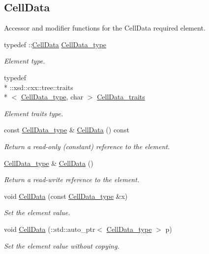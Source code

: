 \subsection*{Cell\-Data}
\label{_amgrp007b3d9997e1a909fe32a9f90c4a9977}%
Accessor and modifier functions for the Cell\-Data required element. \begin{DoxyCompactItemize}
\item 
typedef \-::\hyperlink{classCellData}{Cell\-Data} \hyperlink{classPieceUnstructuredGrid__t_a4232a7b88477ee6f692a4e5fab6a65d1}{Cell\-Data\-\_\-type}
\begin{DoxyCompactList}\small\item\em Element type. \end{DoxyCompactList}\item 
typedef \\*
\-::xsd\-::cxx\-::tree\-::traits\\*
$<$ \hyperlink{classPieceUnstructuredGrid__t_a4232a7b88477ee6f692a4e5fab6a65d1}{Cell\-Data\-\_\-type}, char $>$ \hyperlink{classPieceUnstructuredGrid__t_a0e04d369c16993da7e5e2a7152c2e518}{Cell\-Data\-\_\-traits}
\begin{DoxyCompactList}\small\item\em Element traits type. \end{DoxyCompactList}\item 
const \hyperlink{classPieceUnstructuredGrid__t_a4232a7b88477ee6f692a4e5fab6a65d1}{Cell\-Data\-\_\-type} \& \hyperlink{classPieceUnstructuredGrid__t_a7c7be2b175fa0ec2fc403bb4740865c1}{Cell\-Data} () const 
\begin{DoxyCompactList}\small\item\em Return a read-\/only (constant) reference to the element. \end{DoxyCompactList}\item 
\hyperlink{classPieceUnstructuredGrid__t_a4232a7b88477ee6f692a4e5fab6a65d1}{Cell\-Data\-\_\-type} \& \hyperlink{classPieceUnstructuredGrid__t_a679db045d830876cce6fe04767e7c611}{Cell\-Data} ()
\begin{DoxyCompactList}\small\item\em Return a read-\/write reference to the element. \end{DoxyCompactList}\item 
void \hyperlink{classPieceUnstructuredGrid__t_a6fd0984f28544ef312e860cac18e7144}{Cell\-Data} (const \hyperlink{classPieceUnstructuredGrid__t_a4232a7b88477ee6f692a4e5fab6a65d1}{Cell\-Data\-\_\-type} \&x)
\begin{DoxyCompactList}\small\item\em Set the element value. \end{DoxyCompactList}\item 
void \hyperlink{classPieceUnstructuredGrid__t_af669b0f503d52e5edc2cc0665dc64721}{Cell\-Data} (\-::std\-::auto\-\_\-ptr$<$ \hyperlink{classPieceUnstructuredGrid__t_a4232a7b88477ee6f692a4e5fab6a65d1}{Cell\-Data\-\_\-type} $>$ p)
\begin{DoxyCompactList}\small\item\em Set the element value without copying. \end{DoxyCompactList}\end{DoxyCompactItemize}

